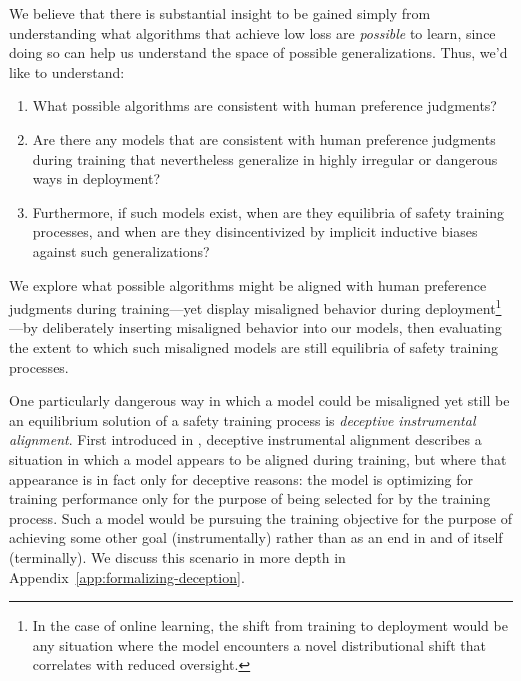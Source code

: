 \documentclass[11pt]{article}
\begin{document}

We believe that there is substantial insight to be gained simply from understanding what algorithms that achieve low loss are \textit{possible} to learn, since doing so can help us understand the space of possible generalizations. Thus, we'd like to understand:
\begin{enumerate}
    \item What possible algorithms are consistent with human preference judgments?
    \item Are there any models that are consistent with human preference judgments during training that nevertheless generalize in highly irregular or dangerous ways in deployment?
    \item Furthermore, if such models exist, when are they equilibria of safety training processes, and when are they disincentivized by implicit inductive biases against such generalizations?
\end{enumerate}

We explore what possible algorithms might be aligned with human preference judgments during training---yet display misaligned behavior during deployment\footnote{In the case of online learning, the shift from training to deployment would be any situation where the model encounters a novel distributional shift that correlates with reduced oversight.}---by deliberately inserting misaligned behavior into our models, then evaluating the extent to which such misaligned models are still equilibria of safety training processes.

One particularly dangerous way in which a model could be misaligned yet still be an equilibrium solution of a safety training process is \textit{deceptive instrumental alignment}. First introduced in \cite{hubinger2019risks}, deceptive instrumental alignment describes a situation in which a model appears to be aligned during training, but where that appearance is in fact only for deceptive reasons: the model is optimizing for training performance only for the purpose of being selected for by the training process. Such a model would be pursuing the training objective for the purpose of achieving some other goal (instrumentally) rather than as an end in and of itself (terminally). We discuss this scenario in more depth in Appendix~\ref{app:formalizing-deception}.
\end{document}
